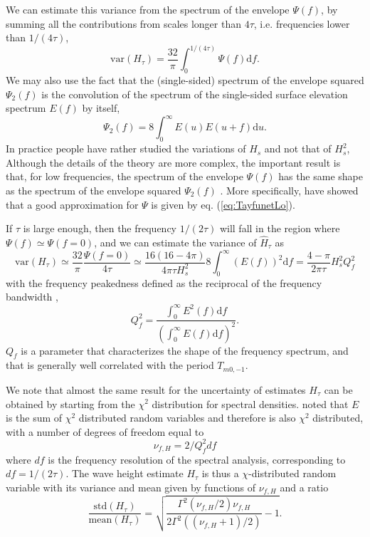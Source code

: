{We can estimate this variance from the spectrum of the envelope $\Psi (f)$, by summing all the contributions from scales longer than $4 \tau$, i.e. frequencies lower than $1/(4 \tau)$, 
\begin{equation}
   \mathrm{var}(H_\tau) = \frac{32}{\pi} \int_0^{1/(4 \tau)} \Psi (f) {\mathrm d} f.
   \label{eq:relation_Hs_eta}
\end{equation}
We may also use the fact that the (single-sided) spectrum of the envelope squared  $\Psi_2(f)$ is the convolution of the spectrum of the single-sided
surface elevation spectrum $E(f)$ by itself,
\begin{equation}
    \Psi_{2}(f) = 8 \int_0^\infty E(u)E(u+f)\mathrm{d}u. 
\label{eq:psi2_1sided}
\end{equation}
 In practice people have rather studied the variations of $H_s$ and not that of $H_s^2$, 
 Although the details of the theory are more complex, the important result is that, for low frequencies, the spectrum of the envelope $\Psi(f)$ has the same shape as the spectrum of the envelope squared $\Psi_2(f)$ \citep{Rice1944}. More specifically, \cite{Tayfun&Lo1989} have showed that a good approximation for $\Psi$ is given by eq. (\ref{eq:TayfunetLo}). 

If $\tau$ is large enough, then the frequency $1/(2 \tau)$ will fall in the region where $\Psi(f) \simeq \Psi(f=0)$, and we can estimate the  variance of $\widehat{H}_\tau$ as
\begin{equation}
   \mathrm{var}(H_\tau)\simeq \frac{32}{\pi} \frac{\Psi (f=0)}{4 \tau} \simeq \frac{16(16 - 4 \pi) }{4 \pi \tau H_s^2} 8 \int_0^\infty (E(f))^2 {\mathrm d}f =  \frac{4 -  \pi }{ 2 \pi  \tau }  H_s^2 Q_f^2 
   \label{eq:groups_var_1D}
\end{equation}
with the frequency peakedness defined as the reciprocal of the frequency bandwidth \citep{Saulnier&al.2012}, 
\begin{equation} 
   Q_f^2 = \frac{  \int_{0}^\infty E^2(f)\mathrm{d}f}{\left(\int_{0}^\infty E(f)\mathrm{d}f\right)^2}. \label{eq:Qf}
\end{equation}
$Q_f$ is a parameter that characterizes the shape of the frequency spectrum, and that is generally well correlated with the period $T_{m0,-1}$. 

We note that almost the same result for the uncertainty of estimates $H_\tau$ can be obtained by starting from the $\chi^2$ distribution for 
spectral densities. \cite{Young1986} noted that $E$ is the sum of $\chi^2$ distributed random variables and therefore is also $\chi^2$ distributed, with a number of degrees of freedom equal to 
\begin{equation}
\nu_{f,H}=2/ Q_f^2 df \label{eq:nuf}
\end{equation}
 where $df$ is the frequency resolution of the spectral analysis, corresponding to $df=1/(2 \tau)$. The wave height estimate $H_\tau$ is thus a $\chi$-distributed random variable with its variance and mean given by  functions of $\nu_{f,H}$ and a ratio 
 \begin{equation}
\frac{\mathrm{std}(H_\tau)}{\mathrm{mean}(H_\tau)} =\sqrt{\frac{\Gamma^2(\nu_{f,H}/2) \nu_{f,H}}{2 \Gamma^2((\nu_{f,H}+1)/2)}-1}.
   \label{eq:groups_var_nu}
\end{equation}
 
}
